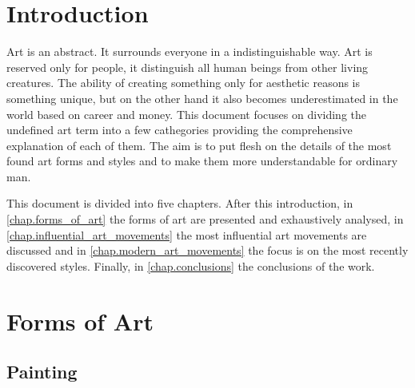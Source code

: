 \documentclass{report}
\begin{document}

\tableofcontents
\listoffigures    %


\clearpage
{}

\chapter{Introduction}
\label{chap.intro}

Art is an abstract. It surrounds everyone in a indistinguishable way. Art is reserved only for people, it distinguish all human beings from other living creatures. The ability of creating something only for aesthetic reasons is something unique, but on the other hand it also becomes underestimated in the world based on career and money. This document focuses on dividing the undefined art term into a few cathegories providing the comprehensive explanation of each of them. The aim is to put flesh on the details of the most found art forms and styles and to make them more understandable for ordinary man.

This document is divided into five chapters.
After this introduction,
in \autoref{chap.forms_of_art} the forms of art are presented and exhaustively analysed,
in \autoref{chap.influential_art_movements} the most influential art movements are discussed
and in \autoref{chap.modern_art_movements} the focus is on the most recently discovered styles.
Finally, in \autoref{chap.conclusions} the conclusions of the work.


\chapter{Forms of Art}
\label{chap.forms_of_art}

\section{Painting}
\end{document}
